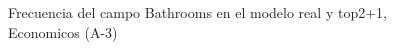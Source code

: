 \begin{figure}[H]
    \centering
    
    \caption{Frecuencia del campo Bathrooms en el modelo real y top2+1, Economicos (A-3)}
    \label{frecuency-Bathrooms-top2+1}
\end{figure}